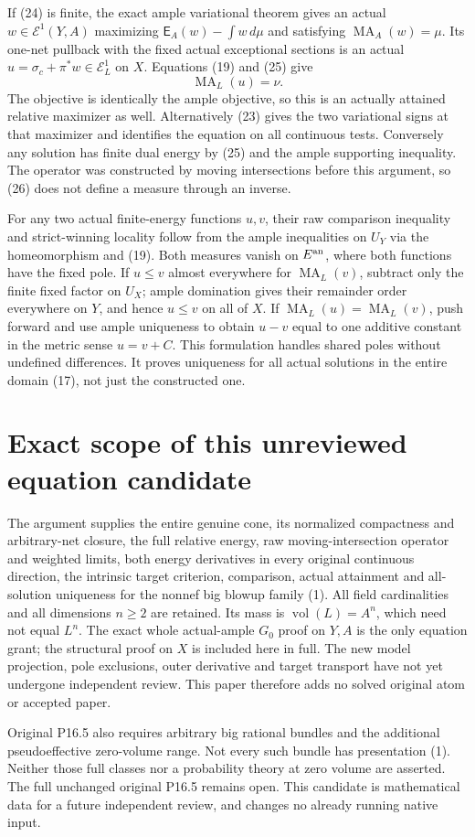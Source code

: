 \documentclass[11pt]{article}
\newcommand{\vol}{\operatorname{vol}}
\newcommand{\MA}{\operatorname{MA}}
\begin{document}
If (24) is finite, the exact ample variational theorem gives an
actual $w\in\mathcal E^1(Y,A)$ maximizing
$\mathsf E_A(w)-\int w\,d\mu$ and satisfying $\MA_A(w)=\mu$.
Its one-net pullback with the fixed actual exceptional sections is
an actual $u=\sigma_c+\pi^*w\in\mathcal E_L^1$ on $X$.
Equations (19) and (25) give
\[
                              \MA_L(u)=\nu.              \tag{26}
\]
The objective is identically the ample objective, so this is an
actually attained relative maximizer as well. Alternatively (23)
gives the two variational signs at that maximizer and identifies
the equation on all continuous tests. Conversely any solution
has finite dual energy by (25) and the ample supporting inequality.
The operator was constructed by moving intersections before this
argument, so (26) does not define a measure through an inverse.

For any two actual finite-energy functions $u,v$, their raw
comparison inequality and strict-winning locality follow from
the ample inequalities on $U_Y$ via the homeomorphism and (19).
Both measures vanish on $E^{\rm an}$, where both functions have
the fixed pole. If $u\leq v$ almost everywhere for $\MA_L(v)$,
subtract only the finite fixed factor on $U_X$; ample domination
gives their remainder order everywhere on $Y$, and hence $u\leq v$
on all of $X$. If $\MA_L(u)=\MA_L(v)$, push forward and use
ample uniqueness to obtain $u-v$ equal to one additive constant
in the metric sense $u=v+C$. This formulation handles shared poles
without undefined differences. It proves uniqueness for all actual
solutions in the entire domain (17), not just the constructed one.

\section{Exact scope of this unreviewed equation candidate}
The argument supplies the entire genuine cone, its normalized
compactness and arbitrary-net closure, the full relative energy,
raw moving-intersection operator and weighted limits, both energy
derivatives in every original continuous direction, the intrinsic
target criterion, comparison, actual attainment and all-solution
uniqueness for the nonnef big blowup family (1). All field cardinalities
and all dimensions $n\geq2$ are retained. Its mass is
$\vol(L)=A^n$, which need not equal $L^n$.
The exact whole actual-ample $G_0$ proof on $Y,A$ is the only
equation grant; the structural proof on $X$ is included here in full.
The new model projection, pole exclusions, outer derivative and
target transport have not yet undergone independent review.
This paper therefore adds no solved original atom or accepted paper.

Original P16.5 also requires arbitrary big rational bundles and the
additional pseudoeffective zero-volume range. Not every such bundle
has presentation (1). Neither those full classes nor a probability
theory at zero volume are asserted. The full unchanged original
P16.5 remains open. This candidate is mathematical data for a future
independent review, and changes no already running native input.
\end{document}
